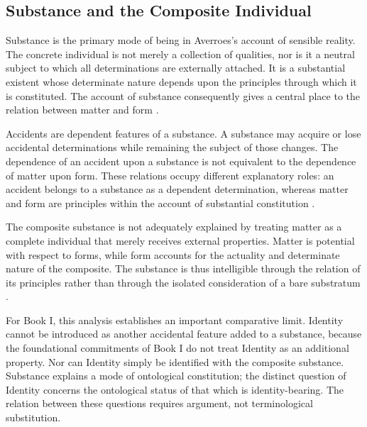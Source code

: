 \subsection{Substance and the Composite Individual}
\label{subsec:ch08_s15_ss04}

\label{para:VS.B01.P01.C08.S15.SS04.P001}

Substance is the primary mode of being in Averroes's account
of sensible reality. The concrete individual is not merely
a collection of qualities, nor is it a neutral subject to
which all determinations are externally attached. It is a
substantial existent whose determinate nature depends upon
the principles through which it is constituted. The account
of substance consequently gives a central place to the
relation between matter and form
\citep{AverroesEpitomeMetaphysicsArnzen2010,
BenAhmedPasnauIbnRushdSEP2025}.

\label{para:VS.B01.P01.C08.S15.SS04.P002}

Accidents are dependent features of a substance. A substance
may acquire or lose accidental determinations while remaining
the subject of those changes. The dependence of an accident
upon a substance is not equivalent to the dependence of
matter upon form. These relations occupy different explanatory
roles: an accident belongs to a substance as a dependent
determination, whereas matter and form are principles within
the account of substantial constitution
\citep{AverroesEpitomeMetaphysicsArnzen2010,
AverroesLongCommentaryMetaphysicsBouyges1990}.

\label{para:VS.B01.P01.C08.S15.SS04.P003}

The composite substance is not adequately explained by
treating matter as a complete individual that merely receives
external properties. Matter is potential with respect to
forms, while form accounts for the actuality and determinate
nature of the composite. The substance is thus intelligible
through the relation of its principles rather than through
the isolated consideration of a bare substratum
\citep{AverroesLongCommentaryMetaphysicsBouyges1990,
BenAhmedPasnauIbnRushdSEP2025}.

\label{para:VS.B01.P01.C08.S15.SS04.P004}

For Book I, this analysis establishes an important comparative
limit. Identity cannot be introduced as another accidental
feature added to a substance, because the foundational
commitments of Book I do not treat Identity as an additional
property. Nor can Identity simply be identified with the
composite substance. Substance explains a mode of ontological
constitution; the distinct question of Identity concerns
the ontological status of that which is identity-bearing.
The relation between these questions requires argument,
not terminological substitution.


